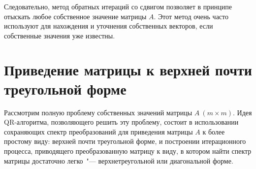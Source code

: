 \documentclass[11pt,a4paper,twoside]{report}
\numberwithin{equation}{section}
\theoremstyle{definition}
\theoremstyle{plain}
\begin{document}
Следовательно, метод обратных итераций со сдвигом позволяет в принципе
отыскать любое собственное значение матрицы $A$. Этот метод очень часто
используют для нахождения и уточнения собственных векторов, если собственные
значения уже известны.

\section{Приведение матрицы к верхней почти треугольной форме}
%
Рассмотрим полную проблему собственных значений матрицы $A~(m \times m)$.
Идея QR-алгоритма, позволяющего решить эту проблему, состоит в использовании
сохраняющих спектр преобразований для приведения матрицы $A$ к
более простому виду: верхней почти треугольной форме, и построении
итерационного процесса, приводящего преобразованную матрицу к виду,
в котором найти спектр матрицы достаточно легко~"---
верхнетреугольной или диагональной форме.
\end{document}
